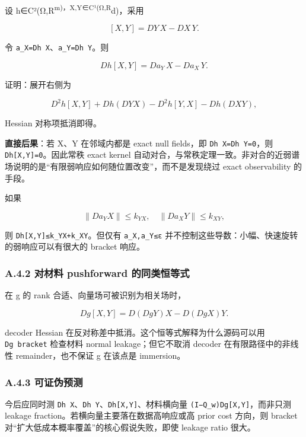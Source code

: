 \documentclass[
  11pt,
  a4paper,
]{article}
\begin{document}
设 h∈C²(Ω,R\textsuperscript{m)，X,Y∈C¹(Ω,R}d)，采用

\[
[X,Y]=DY\,X-DX\,Y.
\]

令 \texttt{a\_\allowbreak{}X=Dh\ X}、\texttt{a\_\allowbreak{}Y=Dh\ Y}。则

\[
\boxed{Dh[X,Y]=D a_Y\,X-D a_X\,Y.}\tag{G1}
\]

证明：展开右侧为

\[
D^2h[X,Y]+Dh(DY X)-D^2h[Y,X]-Dh(DX Y),
\]

Hessian 对称项抵消即得。

\textbf{直接后果}：若 X、Y 在邻域内都是 exact null fields，即
\texttt{Dh\ X=Dh\ Y=0}，则 \texttt{Dh{[}X,Y{]}=0}。因此常秩 exact kernel
自动对合，与常秩定理一致。非对合的近弱谱场说明的是``有限弱响应如何随位置改变''，而不是发现绕过
exact observability 的手段。

如果

\[
\|D a_Y X\|\le k_{YX},\quad \|D a_X Y\|\le k_{XY},
\]

则
\texttt{\textbar{}\textbar{}Dh{[}X,Y{]}\textbar{}\textbar{}≤k\_\allowbreak{}YX+k\_\allowbreak{}XY}。但仅有
\texttt{\textbar{}\textbar{}a\_\allowbreak{}X\textbar{}\textbar{},\textbar{}\textbar{}a\_\allowbreak{}Y\textbar{}\textbar{}≤ε}
并不控制这些导数：小幅、快速旋转的弱响应可以有很大的 bracket 响应。

\hypertarget{a.4.2-ux5bf9ux6750ux6599-pushforward-ux7684ux540cux7c7bux6052ux7b49ux5f0f}{%
\subsubsection{A.4.2 对材料 pushforward
的同类恒等式}\label{a.4.2-ux5bf9ux6750ux6599-pushforward-ux7684ux540cux7c7bux6052ux7b49ux5f0f}}

在 g 的 rank 合适、向量场可被识别为相关场时，

\[
Dg[X,Y]=D(DgY)X-D(DgX)Y.
\]

decoder Hessian 在反对称差中抵消。这个恒等式解释为什么源码可以用
\texttt{Dg\ bracket} 检查材料 normal leakage；但它不取消 decoder
在有限路径中的非线性 remainder，也不保证 g 在该点是 immersion。

\hypertarget{a.4.3-ux53efux8bc1ux4f2aux9884ux6d4b}{%
\subsubsection{A.4.3
可证伪预测}\label{a.4.3-ux53efux8bc1ux4f2aux9884ux6d4b}}

今后应同时测
\texttt{\textbar{}\textbar{}Dh\ X\textbar{}\textbar{}}、\texttt{\textbar{}\textbar{}Dh\ Y\textbar{}\textbar{}}、\texttt{\textbar{}\textbar{}Dh{[}X,Y{]}\textbar{}\textbar{}}、材料横向量
\texttt{\textbar{}\textbar{}(I−Q\_\allowbreak{}w)Dg{[}X,Y{]}\textbar{}\textbar{}}，而非只测
leakage fraction。若横向量主要落在数据高响应或高 prior cost 方向，则
bracket 对``扩大低成本概率覆盖''的核心假说失败，即使 leakage ratio
很大。
\end{document}

